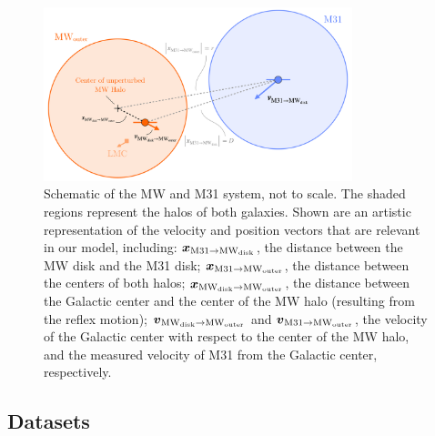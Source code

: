 \documentclass[twocolumn]{aastex631}
\newcommand{\bov}{\ensuremath{\boldsymbol{v}}}
\newcommand{\pos}[2]{\ensuremath{\boldsymbol{x}_{\rm #1 \to #2}}}
\newcommand{\vel}[2]{\ensuremath{\bov_{\rm #1 \to #2}}}
\newcommand{\mwouter}{\ensuremath{\textrm{MW}_\textrm{outer}}}
\newcommand{\mwdisk}{\ensuremath{\textrm{MW}_\textrm{disk}}}
\begin{document}

\begin{figure}[htb]
  \centering
  \includegraphics[width=0.8\textwidth]{schematic-filled.pdf}
  \caption{
    Schematic of the MW and M31 system, not to scale. The shaded regions
    represent the halos of both galaxies. Shown are an artistic representation
    of the velocity and position vectors that are relevant in our model,
    including: $\pos{M31}{\mwdisk}$, the distance between the MW disk and the
    M31 disk;
    $\pos{M31}{\mwouter}$, the distance between the centers of both halos;
    $\pos{\mwdisk}{\mwouter}$, the distance between the Galactic center and the
    center of the MW halo (resulting from the reflex motion);
    $\vel{\mwdisk}{\mwouter}$ and $\vel{M31}{\mwouter}$, the velocity of the
    Galactic center with respect to the center of the MW halo, and the measured
    velocity of M31 from the Galactic center, respectively.
  }
  \label{fig:schematic}
\end{figure}


\subsection{Datasets}
\label{sec:datasets}
\end{document}
